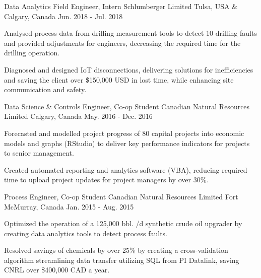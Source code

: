 \begin{cventries}
  \cventry
    {Data Analytics Field Engineer, Intern} %
    {Schlumberger Limited} %
    {Tulsa, USA \& Calgary, Canada} %
    {Jun. 2018 - Jul. 2018} %
    {
      \begin{cvitems} %
        \item {Analysed process data from drilling measurement tools to detect 10 drilling faults and provided adjustments for engineers, decreasing the required time for the drilling operation.}
        \item {Diagnosed and designed IoT disconnections, delivering solutions for inefficiencies and saving the client over \$150,000 USD in lost time, while enhancing site communication and safety.}
      \end{cvitems}
    }

  \cventry
    {Data Science \& Controls Engineer, Co-op Student} %
    {Canadian Natural Resources Limited} %
    {Calgary, Canada} %
    {May. 2016 - Dec. 2016} %
    {
      \begin{cvitems} %
        \item {Forecasted and modelled project progress of 80 capital projects into economic models and graphs (RStudio) to deliver key performance indicators for projects to senior management.}
        \item {Created automated reporting and analytics software (VBA), reducing required time to upload project updates for project managers by over 30\%.}
      \end{cvitems}
    }


  \cventry
    {Process Engineer, Co-op Student} %
    {Canadian Natural Resources Limited} %
    {Fort McMurray, Canada} %
    {Jan. 2015 - Aug. 2015} %
    {
      \begin{cvitems} %
        \item {Optimized the operation of a 125,000 bbl. /d synthetic crude oil upgrader by creating data analytics tools to detect process faults.}
        \item {Resolved savings of chemicals by over 25\% by creating a cross-validation algorithm streamlining data transfer utilizing SQL from PI Datalink, saving CNRL over \$400,000 CAD a year.}
      \end{cvitems}
    }

\end{cventries}
